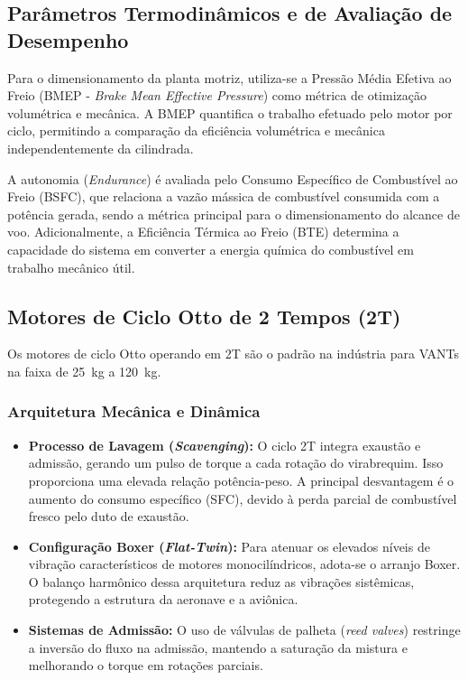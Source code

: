 \documentclass[a4paper,12pt]{article}
\begin{document}
\subsection{Parâmetros Termodinâmicos e de Avaliação de Desempenho}
Para o dimensionamento da planta motriz, utiliza-se a Pressão Média Efetiva ao Freio (BMEP - \textit{Brake Mean Effective Pressure}) como métrica de otimização volumétrica e mecânica. A BMEP quantifica o trabalho efetuado pelo motor por ciclo, permitindo a comparação da eficiência volumétrica e mecânica independentemente da cilindrada. 

A autonomia (\textit{Endurance}) é avaliada pelo Consumo Específico de Combustível ao Freio (BSFC), que relaciona a vazão mássica de combustível consumida com a potência gerada, sendo a métrica principal para o dimensionamento do alcance de voo. Adicionalmente, a Eficiência Térmica ao Freio (BTE) determina a capacidade do sistema em converter a energia química do combustível em trabalho mecânico útil.

\subsection{Motores de Ciclo Otto de 2 Tempos (2T)}
Os motores de ciclo Otto operando em 2T são o padrão na indústria para VANTs na faixa de \SI{25}{kg} a \SI{120}{kg}.

\subsubsection{Arquitetura Mecânica e Dinâmica}
\begin{itemize}
    \item \textbf{Processo de Lavagem (\textit{Scavenging}):} O ciclo 2T integra exaustão e admissão, gerando um pulso de torque a cada rotação do virabrequim. Isso proporciona uma elevada relação potência-peso. A principal desvantagem é o aumento do consumo específico (SFC), devido à perda parcial de combustível fresco pelo duto de exaustão.
    \item \textbf{Configuração Boxer (\textit{Flat-Twin}):} Para atenuar os elevados níveis de vibração característicos de motores monocilíndricos, adota-se o arranjo Boxer. O balanço harmônico dessa arquitetura reduz as vibrações sistêmicas, protegendo a estrutura da aeronave e a aviônica.
    \item \textbf{Sistemas de Admissão:} O uso de válvulas de palheta (\textit{reed valves}) restringe a inversão do fluxo na admissão, mantendo a saturação da mistura e melhorando o torque em rotações parciais.
\end{itemize}
\end{document}
